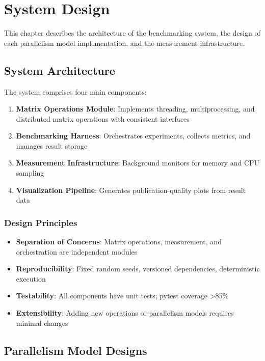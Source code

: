 \chapter{System Design}

This chapter describes the architecture of the benchmarking system, the design of each parallelism model implementation, and the measurement infrastructure.

\section{System Architecture}

The system comprises four main components:

\begin{enumerate}
    \item \textbf{Matrix Operations Module}: Implements threading, multiprocessing, and distributed matrix operations with consistent interfaces
    \item \textbf{Benchmarking Harness}: Orchestrates experiments, collects metrics, and manages result storage
    \item \textbf{Measurement Infrastructure}: Background monitors for memory and CPU sampling
    \item \textbf{Visualization Pipeline}: Generates publication-quality plots from result data
\end{enumerate}

\subsection{Design Principles}

\begin{itemize}
    \item \textbf{Separation of Concerns}: Matrix operations, measurement, and orchestration are independent modules
    \item \textbf{Reproducibility}: Fixed random seeds, versioned dependencies, deterministic execution
    \item \textbf{Testability}: All components have unit tests; pytest coverage >85\%
    \item \textbf{Extensibility}: Adding new operations or parallelism models requires minimal changes
\end{itemize}

\section{Parallelism Model Designs}

